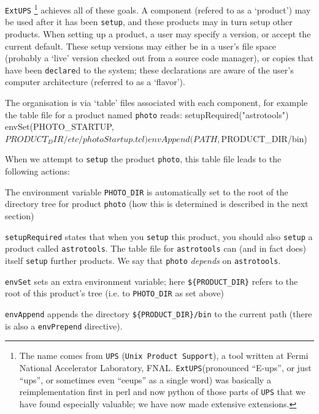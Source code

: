 \documentclass{article}
\newcommand{\code}[1]{\texttt{#1}}
\newcommand{\eups}{\code{ExtUPS}\xspace}
\let\overbatim=\verbatim
\let\oendverbatim=\endverbatim
\renewenvironment{verbatim}
{\center\minipage{16cm}\overbatim}
{\oendverbatim\endminipage\endcenter}
\begin{document}
\eups
\footnote{%
  The name comes from \code{UPS} (\code{Unix Product Support}), a
  tool written at Fermi National Accelerator Laboratory, FNAL. \eups (pronounced ``E-ups'',
  or just ``ups'', or sometimes even ``eeups'' as a single word) 
  was basically a reimplementation first in perl and now python of those parts of \code{UPS}
  that we have found especially valuable;  we have now made extensive extensions.}
achieves all of these goals. A component (refered to as a `product')
may be used after it has been \code{setup}, and these products may
in turn setup other products. When setting up a product, a user
may specify a version, or accept the current default. These setup versions
may either be in a user's file space (probably a `live' version checked out from a source code manager),
or copies that have been \code{declare}d to the system; these declarations are
aware of the user's computer architecture (referred to as a `flavor').

The organisation is via `table' files
associated with each component, for example the table file
for a product named \code{photo} reads:
\begin{verbatim}
       setupRequired("astrotools")
       envSet(PHOTO_STARTUP, ${PRODUCT_DIR}/etc/photoStartup.tcl)
       envAppend(PATH, ${PRODUCT_DIR}/bin)
\end{verbatim}

When we attempt to \code{setup} the product \code{photo}, this
table file leads to the following actions:
\begin{description}
\item
  The environment variable \code{PHOTO\_DIR} is automatically set to 
  the root of the directory tree for product \code{photo} (how this
  is determined is described in the next section)
\item
  \code{setupRequired} states that when you \code{setup} this product, you
  should also \code{setup} a product called \code{astrotools}.
  The table file for \code{astrotools} can
  (and in fact does) itself \code{setup} further products.  We say that
  \code{photo} \emph{depends} on \code{astrotools}.
\item
  \code{envSet} sets an extra environment variable; here \code{\$\{PRODUCT\_DIR\}}
  refers to the root of this product's tree (i.e. to \code{PHOTO\_DIR} as set above)
\item
  \code{envAppend} appends
  the directory \code{\$\{PRODUCT\_DIR\}/bin} to the current path (there
  is also a \code{envPrepend} directive).
\end{description}
\end{document}
